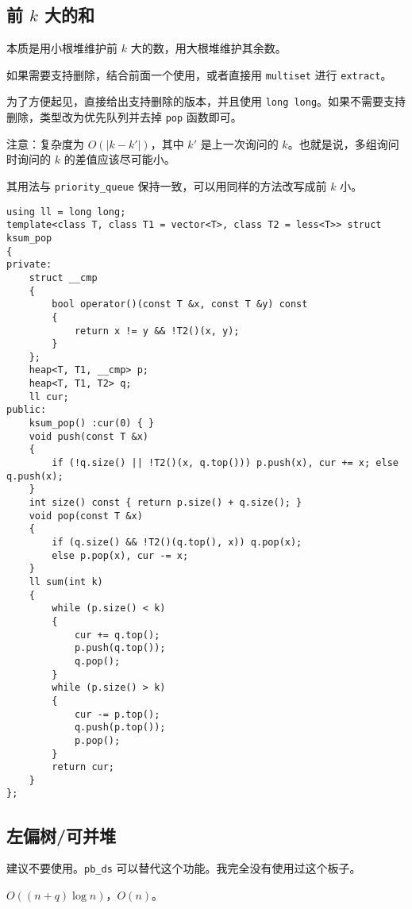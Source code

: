 \documentclass[12pt]{ctexart}
\begin{document}
\subsection{前 $k$ 大的和}

本质是用小根堆维护前 $k$ 大的数，用大根堆维护其余数。

如果需要支持删除，结合前面一个使用，或者直接用 \verb|multiset| 进行 \verb|extract|。

为了方便起见，直接给出支持删除的版本，并且使用 \verb|long long|。如果不需要支持删除，类型改为优先队列并去掉 \verb|pop| 函数即可。

注意：复杂度为 $O(|k-k'|)$，其中 $k'$ 是上一次询问的 $k$。也就是说，多组询问时询问的 $k$ 的差值应该尽可能小。

其用法与 \verb|priority_queue| 保持一致，可以用同样的方法改写成前 $k$ 小。

\begin{lstlisting}
using ll = long long;
template<class T, class T1 = vector<T>, class T2 = less<T>> struct ksum_pop
{
private:
	struct __cmp
	{
		bool operator()(const T &x, const T &y) const
		{
			return x != y && !T2()(x, y);
		}
	};
	heap<T, T1, __cmp> p;
	heap<T, T1, T2> q;
	ll cur;
public:
	ksum_pop() :cur(0) { }
	void push(const T &x)
	{
		if (!q.size() || !T2()(x, q.top())) p.push(x), cur += x; else q.push(x);
	}
	int size() const { return p.size() + q.size(); }
	void pop(const T &x)
	{
		if (q.size() && !T2()(q.top(), x)) q.pop(x);
		else p.pop(x), cur -= x;
	}
	ll sum(int k)
	{
		while (p.size() < k)
		{
			cur += q.top();
			p.push(q.top());
			q.pop();
		}
		while (p.size() > k)
		{
			cur -= p.top();
			q.push(p.top());
			p.pop();
		}
		return cur;
	}
};

\end{lstlisting}

\subsection{左偏树/可并堆}

建议不要使用。\verb|pb_ds| 可以替代这个功能。我完全没有使用过这个板子。

$O((n+q)\log n)$，$O(n)$。
\end{document}
